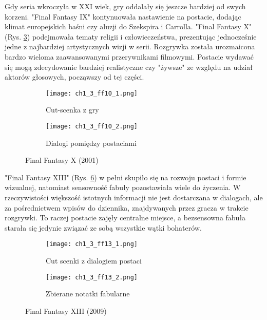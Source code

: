 \newpage

Gdy seria wkroczyła w XXI wiek, gry oddalały się jeszcze bardziej od swych korzeni. "Final Fantasy
IX" kontynuowała nastawienie na postacie, dodając klimat europejskich baśni czy aluzji do Szekspira i
Carrolla. "Final Fantasy X" (Rys. \ref{fig:ch1_3_ff10}) podejmowała tematy religii i człowieczeństwa,
prezentując jednocześnie jedne z najbardziej artystycznych wizji w serii\cite{the_evolution_of_final_fantasy}.
Rozgrywka została urozmaicona bardzo wieloma zaawansowanymi przerywnikami filmowymi. Postacie wydawać się
mogą zdecydowanie bardziej realistyczne czy "żywsze" ze względu na udział aktorów głosowych, począwszy
od tej części.

\begin{figure}[h]
    \begin{subfigure}{0.49\textwidth}
        \caption{Cut-scenka z gry}
        \texttt{[image: ch1\_3\_ff10\_1.png]}
        \label{subfig:ch_1_3_ff10_1}
    \end{subfigure}
    \begin{subfigure}{0.49\textwidth}
        \caption{Dialogi pomiędzy postaciami}
        \texttt{[image: ch1\_3\_ff10\_2.png]}
        \label{subfig:ch_1_3_ff10_2}
    \end{subfigure}
    \caption{Final Fantasy X (2001)}
    \label{fig:ch1_3_ff10}
\end{figure}

\newpage

"Final Fantasy XIII" (Rys. \ref{fig:ch1_3_ff13}) w pełni skupiło się na rozwoju postaci i
formie wizualnej, natomiast sensowność fabuły pozostawiała wiele do życzenia. W rzeczywistości większość
istotnych informacji nie jest dostarczana w dialogach, ale za pośrednictwem wpisów do dziennika,
znajdywanych przez gracza w trakcie rozgrywki. To raczej postacie zajęły centralne miejsce, a
bezsensowna fabuła starała się jedynie związać ze sobą wszystkie wątki
bohaterów\cite{the_evolution_of_final_fantasy}.

\begin{figure}[h]
    \begin{subfigure}{0.49\textwidth}
        \caption{Cut scenki z dialogiem postaci}
        \texttt{[image: ch1\_3\_ff13\_1.png]}
        \label{subfig:ch_1_3_ff13_1}
    \end{subfigure}
    \begin{subfigure}{0.49\textwidth}
        \caption{Zbierane notatki fabularne}
        \texttt{[image: ch1\_3\_ff13\_2.png]}
        \label{subfig:ch_1_3_ff13_2}
    \end{subfigure}
    \caption{Final Fantasy XIII (2009)}
    \label{fig:ch1_3_ff13}
\end{figure}

